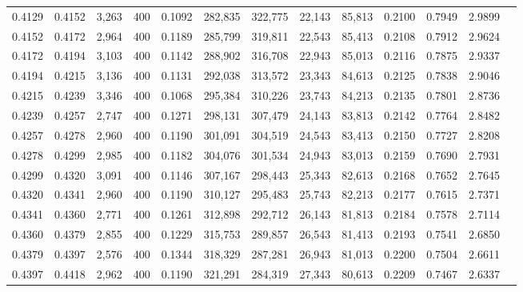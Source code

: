 \begin{tabular}{rrrrrrrrrrrrr}
0.4129 & 0.4152 &  3,263 & 400 &                                     0.1092 & 282,835 & 322,775 &  22,143 &  85,813 & 0.2100 & 0.7949 & 2.9899 \\
0.4152 & 0.4172 &  2,964 & 400 &                                     0.1189 & 285,799 & 319,811 &  22,543 &  85,413 & 0.2108 & 0.7912 & 2.9624 \\
0.4172 & 0.4194 &  3,103 & 400 &                                     0.1142 & 288,902 & 316,708 &  22,943 &  85,013 & 0.2116 & 0.7875 & 2.9337 \\
0.4194 & 0.4215 &  3,136 & 400 &                                     0.1131 & 292,038 & 313,572 &  23,343 &  84,613 & 0.2125 & 0.7838 & 2.9046 \\
0.4215 & 0.4239 &  3,346 & 400 &                                     0.1068 & 295,384 & 310,226 &  23,743 &  84,213 & 0.2135 & 0.7801 & 2.8736 \\
0.4239 & 0.4257 &  2,747 & 400 &                                     0.1271 & 298,131 & 307,479 &  24,143 &  83,813 & 0.2142 & 0.7764 & 2.8482 \\
0.4257 & 0.4278 &  2,960 & 400 &                                     0.1190 & 301,091 & 304,519 &  24,543 &  83,413 & 0.2150 & 0.7727 & 2.8208 \\
0.4278 & 0.4299 &  2,985 & 400 &                                     0.1182 & 304,076 & 301,534 &  24,943 &  83,013 & 0.2159 & 0.7690 & 2.7931 \\
0.4299 & 0.4320 &  3,091 & 400 &                                     0.1146 & 307,167 & 298,443 &  25,343 &  82,613 & 0.2168 & 0.7652 & 2.7645 \\
0.4320 & 0.4341 &  2,960 & 400 &                                     0.1190 & 310,127 & 295,483 &  25,743 &  82,213 & 0.2177 & 0.7615 & 2.7371 \\
0.4341 & 0.4360 &  2,771 & 400 &                                     0.1261 & 312,898 & 292,712 &  26,143 &  81,813 & 0.2184 & 0.7578 & 2.7114 \\
0.4360 & 0.4379 &  2,855 & 400 &                                     0.1229 & 315,753 & 289,857 &  26,543 &  81,413 & 0.2193 & 0.7541 & 2.6850 \\
0.4379 & 0.4397 &  2,576 & 400 &                                     0.1344 & 318,329 & 287,281 &  26,943 &  81,013 & 0.2200 & 0.7504 & 2.6611 \\
0.4397 & 0.4418 &  2,962 & 400 &                                     0.1190 & 321,291 & 284,319 &  27,343 &  80,613 & 0.2209 & 0.7467 & 2.6337 \\

\end{tabular}
